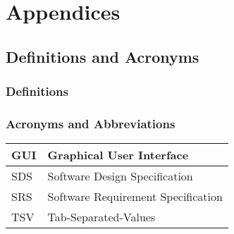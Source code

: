 \documentclass[a4paper, 11pt]{article}
\begin{document}
\section{Appendices}

\subsection{Definitions and Acronyms}
\subsubsection{Definitions}
\subsubsection{Acronyms and Abbreviations}

	\begin{tabular}{ | m{1cm} | m{10cm} | } 
		\hline
		GUI & Graphical User Interface \\
		\hline
		SDS & Software Design Specification \\
		\hline
		SRS & Software Requirement Specification  \\
		\hline
		TSV & Tab-Separated-Values \\
		\hline
	\end{tabular}
\end{document}
